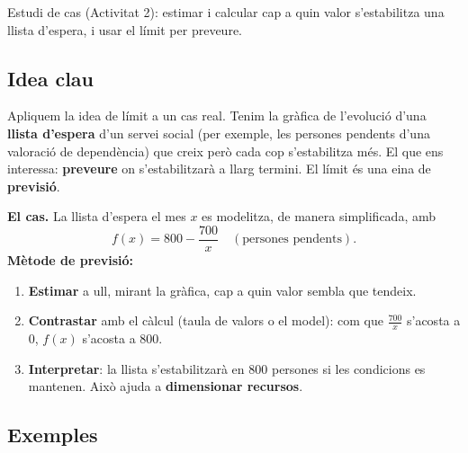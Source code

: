 %
{Estudi de cas (Activitat 2): estimar i calcular cap a quin valor s'estabilitza una llista d'espera, i usar el límit per preveure.}

\subsection{Idea clau}

Apliquem la idea de límit a un cas real. Tenim la gràfica de l'evolució d'una
\textbf{llista d'espera} d'un servei social (per exemple, les persones pendents d'una
valoració de dependència) que creix però cada cop s'estabilitza més. El que ens
interessa: \textbf{preveure} on s'estabilitzarà a llarg termini. El límit és una eina
de \textbf{previsió}.

\begin{idea}
\textbf{El cas.} La llista d'espera el mes $x$ es modelitza, de manera simplificada,
amb
\[
f(x)=800-\frac{700}{x}\quad(\text{persones pendents}).
\]
\textbf{Mètode de previsió:}
\begin{enumerate}[leftmargin=1.6em, itemsep=2pt]
  \item \textbf{Estimar} a ull, mirant la gràfica, cap a quin valor sembla que tendeix.
  \item \textbf{Contrastar} amb el càlcul (taula de valors o el model): com que
        $\frac{700}{x}$ s'acosta a $0$, $f(x)$ s'acosta a $800$.
  \item \textbf{Interpretar}: la llista s'estabilitzarà en $800$ persones si les
        condicions es mantenen. Això ajuda a \textbf{dimensionar recursos}.
\end{enumerate}
\end{idea}

\subsection{Exemples}

